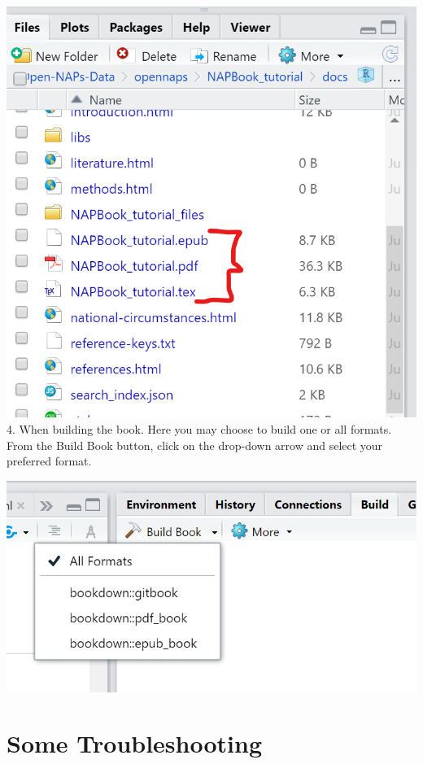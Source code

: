 \documentclass[
]{book}
\let\origfigure\figure
\let\endorigfigure\endfigure
\renewenvironment{figure}[1][2] {
    \expandafter\origfigure\expandafter[H]
} {
    \endorigfigure
}
\begin{document}
\includegraphics{tutorial_screenshots/docs_folder_contents.png}\\
4. When building the book. Here you may choose to build one or all formats. From the Build Book button, click on the drop-down arrow and select your preferred format.

\begin{figure}
\centering
\includegraphics{tutorial_screenshots/build_book_drop_down.png}
\caption{Build book format options}
\end{figure}

\hypertarget{some-troubleshooting}{%
\section{Some Troubleshooting}\label{some-troubleshooting}}
\end{document}
